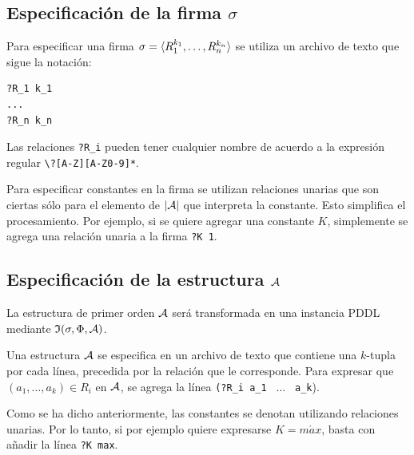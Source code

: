\subsection{Especificación de la firma $\sigma$}
Para especificar una firma $\sigma = \langle R_1^{k_1},\ldots,R_n^{k_n} \rangle$ se
utiliza un archivo de texto que sigue la notación:
\begin{verbatim}
?R_1 k_1
...
?R_n k_n
\end{verbatim}
Las relaciones \texttt{?R\_i} pueden tener cualquier nombre de acuerdo a la
expresión regular \texttt{\textbackslash?[A-Z][A-Z0-9]*}.

Para especificar constantes en la firma se utilizan relaciones unarias que son
ciertas sólo para el elemento de $|\mathcal{A}|$ que interpreta la constante.
Esto simplifica el procesamiento. Por ejemplo, si se quiere agregar una
constante $K$, simplemente se agrega una relación unaria a la
firma \texttt{?K 1}.

\subsection{Especificación de la estructura $\mathcal{A}$}
La estructura de primer orden $\mathcal{A}$ será transformada en una instancia PDDL
mediante $\mathfrak{I}(\sigma,\Phi,\mathcal{A})$.

Una estructura $\mathcal{A}$ se especifica en un archivo de texto que contiene una
$k$-tupla por cada línea, precedida por la relación que le corresponde.
Para expresar que $(a_1,\ldots,a_k) \in R_i$ en $\mathcal{A}$, se agrega la línea
\texttt{(?R\_i a\_1 } $\ldots$ \texttt{ a\_k}).

Como se ha dicho anteriormente, las constantes se denotan utilizando relaciones
unarias. Por lo tanto, si por ejemplo quiere expresarse $K = m\acute{a}x$,
basta con añadir la línea \texttt{?K max}.



